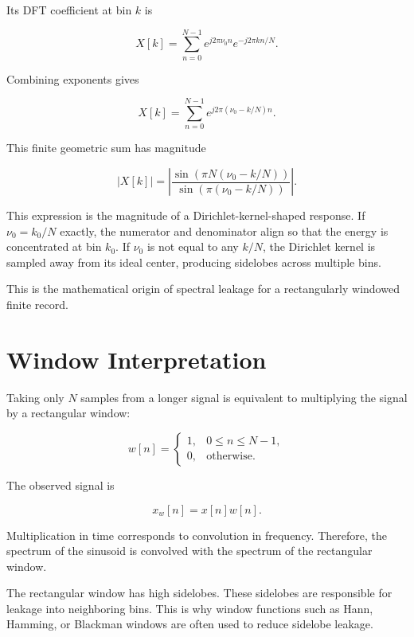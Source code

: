 ﻿\documentclass[11pt]{article}
\begin{document}
Its DFT coefficient at bin $k$ is

\begin{equation}
X[k]
=
\sum_{n=0}^{N-1}
e^{j2\pi \nu_0 n}
e^{-j2\pi kn/N}.
\end{equation}

Combining exponents gives

\begin{equation}
X[k]
=
\sum_{n=0}^{N-1}
e^{j2\pi(\nu_0 - k/N)n}.
\end{equation}

This finite geometric sum has magnitude

\begin{equation}
|X[k]|
=
\left|
\frac{\sin\left(\pi N(\nu_0-k/N)\right)}
{\sin\left(\pi(\nu_0-k/N)\right)}
\right|.
\end{equation}

This expression is the magnitude of a Dirichlet-kernel-shaped response. If $\nu_0 = k_0/N$ exactly, the numerator and denominator align so that the energy is concentrated at bin $k_0$. If $\nu_0$ is not equal to any $k/N$, the Dirichlet kernel is sampled away from its ideal center, producing sidelobes across multiple bins.

This is the mathematical origin of spectral leakage for a rectangularly windowed finite record.

\section{Window Interpretation}

Taking only $N$ samples from a longer signal is equivalent to multiplying the signal by a rectangular window:

\begin{equation}
w[n]
=
\begin{cases}
1, & 0 \leq n \leq N-1,\\
0, & \text{otherwise}.
\end{cases}
\end{equation}

The observed signal is

\begin{equation}
x_w[n] = x[n]w[n].
\end{equation}

Multiplication in time corresponds to convolution in frequency. Therefore, the spectrum of the sinusoid is convolved with the spectrum of the rectangular window.

The rectangular window has high sidelobes. These sidelobes are responsible for leakage into neighboring bins. This is why window functions such as Hann, Hamming, or Blackman windows are often used to reduce sidelobe leakage.
\end{document}
